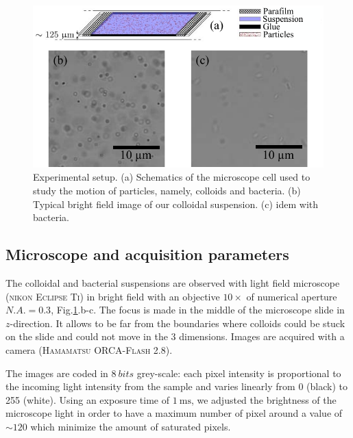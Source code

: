 \documentclass[%
 aip,
 jmp,%
 amsmath,amssymb,
reprint,%
]{revtex4-1}
\newcommand{\tg}[1]{{\color{magenta}#1}} %
\begin{document}
\begin{figure}
\includegraphics[width=\linewidth]{Lamelle_Photos.pdf}
\caption{Experimental setup. (a) Schematics of the microscope cell used to study the motion of particles, namely, colloids and bacteria. (b) Typical bright field image of our colloidal suspension. (c) idem with bacteria.}
\label{Slide}
\end{figure}

\subsection{Microscope and acquisition parameters}

The colloidal and bacterial suspensions are observed with light field microscope\cite{Mignard2015} (\textsc{nikon Eclipse Ti}) in \tg{bright field} with an objective $10 \times$ of numerical aperture $N.A. = 0.3$, Fig.\ref{Slide}.b-c. The focus is made in the middle of the microscope slide in $z$-direction. It allows to be far from the boundaries where colloids could be stuck on the slide and could not move in the 3 dimensions. Images are acquired with a camera (\textsc{Hamamatsu ORCA-Flash 2.8}).



The images are coded in $\SI{8}{bits}$  grey-scale: each pixel intensity is proportional to the incoming light intensity from the sample and varies linearly from  0 (black) to 255 (white). Using an exposure time of $\SI{1}{\milli\second}$, we adjusted the brightness of the microscope light in order to have a maximum number of pixel around a value of $\sim 120$ which minimize the amount of saturated pixels.
\end{document}

